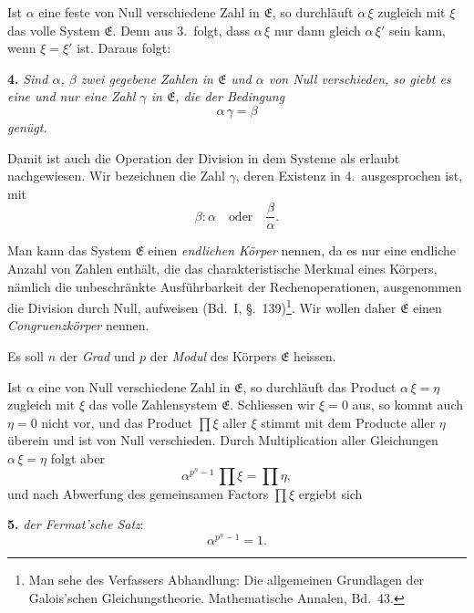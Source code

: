 \documentclass[12pt,a4paper]{article}
\begin{document}
Ist $\alpha$ eine feste von Null verschiedene Zahl in $\mathfrak{E}$, so durchläuft $\alpha\,\xi$ zugleich mit $\xi$ das volle System $\mathfrak{E}$. Denn aus 3.~folgt, dass $\alpha\,\xi$ nur dann gleich $\alpha\,\xi'$ sein kann, wenn $\xi = \xi'$ ist. Daraus folgt:

\medskip\noindent
\textbf{4.} \emph{Sind $\alpha$, $\beta$ zwei gegebene Zahlen in $\mathfrak{E}$ und $\alpha$ von Null verschieden, so giebt es eine und nur eine Zahl $\gamma$ in $\mathfrak{E}$, die der Bedingung}
\[
\alpha\,\gamma = \beta
\]
\emph{genügt.}

Damit ist auch die Operation der Division in dem Systeme als erlaubt nachgewiesen. Wir bezeichnen die Zahl $\gamma$, deren Existenz in 4.~ausgesprochen ist, mit
\[
\beta : \alpha\quad\text{oder}\quad \frac{\beta}{\alpha}.
\]

\newpage
{}

Man kann das System $\mathfrak{E}$ einen \emph{endlichen Körper} nennen, da es nur eine endliche Anzahl von Zahlen enthält, die das charakteristische Merkmal eines Körpers, nämlich die unbeschränkte Ausführbarkeit der Rechenoperationen, ausgenommen die Division durch Null, aufweisen (Bd.~I, \S.~139)\footnote{Man sehe des Verfassers Abhandlung: Die allgemeinen Grundlagen der Galois'schen Gleichungstheorie. Mathematische Annalen, Bd.~43.}. Wir wollen daher $\mathfrak{E}$ einen \emph{Congruenzkörper} nennen.

Es soll $n$ der \emph{Grad} und $p$ der \emph{Modul} des Körpers $\mathfrak{E}$ heissen.

Ist $\alpha$ eine von Null verschiedene Zahl in $\mathfrak{E}$, so durchläuft das Product $\alpha\,\xi = \eta$ zugleich mit $\xi$ das volle Zahlensystem $\mathfrak{E}$. Schliessen wir $\xi = 0$ aus, so kommt auch $\eta = 0$ nicht vor, und das Product $\prod \xi$ aller $\xi$ stimmt mit dem Producte aller $\eta$ überein und ist von Null verschieden. Durch Multiplication aller Gleichungen $\alpha\,\xi = \eta$ folgt aber
\[
\alpha^{p^{n}-1}\,\prod \xi = \prod \eta,
\]
und nach Abwerfung des gemeinsamen Factors $\prod \xi$ ergiebt sich

\medskip\noindent
\textbf{5.} \emph{der Fermat'sche Satz}:
\begin{equation}\label{eq:64.3}
\tag{3}
\alpha^{p^{n}-1} = 1.
\end{equation}
\end{document}
